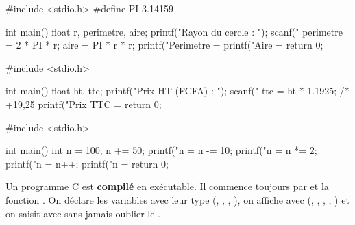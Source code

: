 \begin{codec}
#include <stdio.h>
#define PI 3.14159

int main()
{
    float r, perimetre, aire;
    printf("Rayon du cercle : ");
    scanf("%
    perimetre = 2 * PI * r;
    aire = PI * r * r;
    printf("Perimetre = %
    printf("Aire = %
    return 0;
}
\end{codec}

\begin{codec}
#include <stdio.h>

int main()
{
    float ht, ttc;
    printf("Prix HT (FCFA) : ");
    scanf("%
    ttc = ht * 1.1925;     /* +19,25 %
    printf("Prix TTC = %
    return 0;
}
\end{codec}

\begin{codec}
#include <stdio.h>

int main()
{
    int n = 100;
    n += 50;   printf("n = %
    n -= 10;   printf("n = %
    n *= 2;    printf("n = %
    n++;       printf("n = %
    return 0;
}
\end{codec}

\begin{aretenir}
Un programme C est \textbf{compilé} en exécutable. Il commence toujours par
 et la fonction .
On déclare les variables avec leur type (, , ,
), on affiche avec  (, , ,
, ) et on saisit avec  sans jamais
oublier le \code{\&}.
\end{aretenir}
